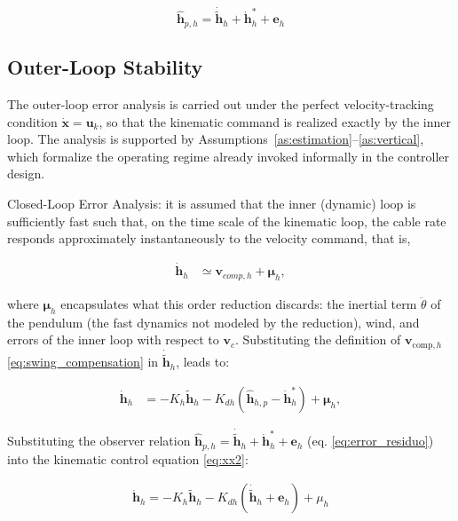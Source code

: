 \documentclass[sn-mathphys-num]{sn-jnl}
\theoremstyle{thmstyleone}%
\theoremstyle{thmstyletwo}%
\theoremstyle{thmstylethree}%
\begin{document}
\begin{equation}\label{eq:error_residuo} 
\hat{\mathbf{h}}_{p,h} = \dot{\tilde{\mathbf{h}}}_h + \dot{\mathbf{h}}_h^* + \mathbf{e}_h
\end{equation}

\subsection{Outer-Loop Stability}
\label{sec:closed_loop_analysis}

The outer-loop error analysis is carried out under the perfect velocity-tracking
condition $\dot{\mathbf{x}}=\mathbf{u}_k$, so that the kinematic command is realized exactly by the inner loop. The analysis is supported by Assumptions~\ref{as:estimation}--\ref{as:vertical}, which formalize the operating regime already invoked informally in the controller design.

Closed-Loop Error Analysis: it is assumed that the inner (dynamic) loop is sufficiently fast such that, on the time scale of the kinematic loop, the cable rate responds approximately instantaneously to the velocity command, that is,

\begin{align}
\dot{\mathbf{h}}_h
&\simeq \mathbf{v}_{comp,h} + \boldsymbol{\mu}_h,
\label{eq:xx1}
\end{align}

where $\boldsymbol\mu_h$ encapsulates what this order reduction discards: the inertial term $\ddot{\theta}$
of the pendulum (the fast dynamics not modeled by the reduction), wind, and errors of the inner loop with respect to $\mathbf{v}_c$. Substituting the definition of $\mathbf{v}_{\mathrm{comp},h}$ \eqref{eq:swing_compensation} in $\dot{\tilde{\mathbf{h}}}_h$, leads to:

\begin{align}
\dot{\mathbf{h}}_h
&=-K_h\tilde{\mathbf{h}}_h-K_{dh}(\hat{\mathbf{h}}_{h,p}-\dot{\mathbf{h}}^*_h) + \boldsymbol{\mu}_h,
\label{eq:xx2}
\end{align}

Substituting the observer relation $\hat{\mathbf{h}}_{p,h} = \dot{\tilde{\mathbf{h}}}_h + \dot{\mathbf{h}}_h^* + \mathbf{e}_h$ (eq. \eqref{eq:error_residuo}) into the kinematic control equation  \eqref{eq:xx2}:

\begin{align}
\dot{\mathbf{h}}_h = -K_h \tilde{\mathbf{h}}_h - K_{dh} (\dot{\tilde{\mathbf{h}}}_h + \mathbf{e}_h) + \mu_h
\end{align}
\end{document}
